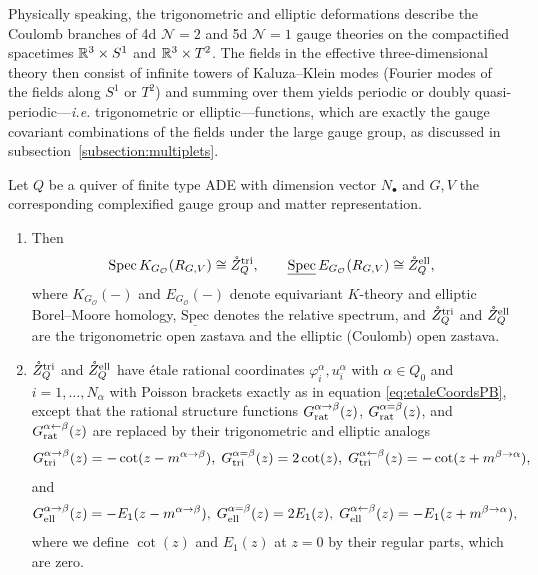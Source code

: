 Physically speaking, the trigonometric and elliptic deformations describe the Coulomb branches of 4d $\mathcal{N}=2$ and 5d $\mathcal{N}=1$ gauge theories on the compactified spacetimes $\mathbb{R}^3 \times S^1$ and $\mathbb{R}^3 \times T^2$. The fields in the effective three-dimensional theory then consist of infinite towers of Kaluza--Klein modes (Fourier modes of the fields along $S^1$ or $T^2$) and summing over them yields periodic or doubly quasi-periodic---\emph{i.e.} trigonometric or elliptic---functions, which are exactly the gauge covariant combinations of the fields under the large gauge group, as discussed in subsection~\ref{subsection:multiplets}.

\begin{prop}
	Let $Q$ be a quiver of finite type ADE with dimension vector $N_\bullet$ and $G,V$ the corresponding complexified gauge group and matter representation.
	\begin{enumerate}[label=(\roman*)]
	\item Then
	\begin{equation}
		\operatorname{Spec} K_{G_\mathcal{O}}(R_{G,V}) \cong \mathring Z_Q^\textup{tri}, \qquad \operatorname{\underline{Spec}} E_{G_\mathcal{O}}(R_{G,V}) \cong \mathring Z_Q^\textup{ell},
	\end{equation}		
	where $K_{G_\mathcal{O}}(-)$ and $E_{G_\mathcal{O}}(-)$ denote equivariant $K$-theory and elliptic Borel--Moore homology, $\operatorname{\underline{Spec}}$ denotes the relative spectrum, and $\mathring Z_Q^\textup{tri}$ and $\mathring Z_Q^\textup{ell}$ are the trigonometric open zastava and the elliptic (Coulomb) open zastava.
	\item $\mathring Z_Q^\textup{tri}$ and $\mathring Z_Q^\textup{ell}$ have étale rational coordinates $\varphi_i^\alpha,u_i^\alpha$ with $\alpha \in Q_0$ and $i=1,\dots,N_\alpha$ with Poisson brackets exactly as in equation \eqref{eq:etaleCoordsPB}, except that the rational structure functions $G_\textup{rat}^{\alpha \to \beta}(z)$, $G_\textup{rat}^{\alpha = \beta}(z)$, and $G_\textup{rat}^{\alpha \leftarrow \beta}(z)$ are replaced by their trigonometric and elliptic analogs
	\begin{align}
		G_\textup{tri}^{\alpha \to \beta}(z) = -\cot(z-m^{\alpha\to\beta}), \;
		G_\textup{tri}^{\alpha = \beta}(z) = 2\cot(z), \;
		G_\textup{tri}^{\alpha \leftarrow \beta}(z) = -\cot(z+m^{\beta\to\alpha}),
	\end{align}
	and
	\begin{align}
		G_\textup{ell}^{\alpha \to \beta}(z) = -E_1(z-m^{\alpha\to\beta}), \;
		G_\textup{ell}^{\alpha = \beta}(z) =
		2 E_1(z), \;
		G_\textup{ell}^{\alpha \leftarrow \beta}(z) = -E_1(z+m^{\beta\to\alpha}),
	\end{align}
	where we define $\cot(z)$ and $E_1(z)$ at $z=0$ by their regular parts, which are zero.
	\end{enumerate}
\end{prop}

